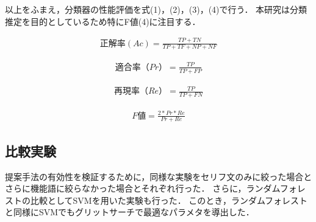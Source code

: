 以上をふまえ，分類器の性能評価を式(1)，(2)，(3)，(4)で行う．
本研究は分類推定を目的としているため特にF値(4)に注目する．

\begin{eqnarray}
  正解率(Ac) =  \frac{TP + TN} {TP + TF + NP + NF}
\end{eqnarray}

\begin{eqnarray}
  適合率（Pr） = \frac{TP} {TP + FP}
\end{eqnarray}

\begin{eqnarray}
  再現率（Re） =  \frac{TP} {TP + FN}
\end{eqnarray}

\begin{eqnarray}
  F値 =  \frac{2*Pr*Re}{Pr + Re}
\end{eqnarray}


\subsection{比較実験}
提案手法の有効性を検証するために，同様な実験をセリフ文のみに絞った場合とさらに機能語に絞らなかった場合とそれぞれ行った．
さらに，ランダムフォレストの比較としてSVMを用いた実験も行った．
このとき，ランダムフォレストと同様にSVMでもグリットサーチで最適なパラメタを導出した．
